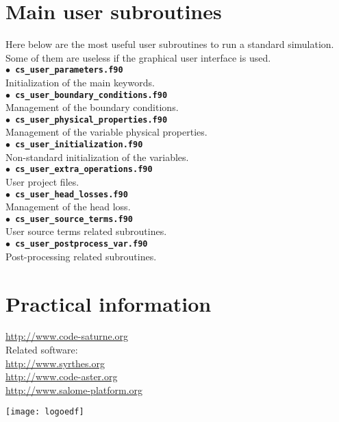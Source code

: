 \documentclass[a4paper,11pt]{article}
\newcommand{\refword}[1]{\texttt{$\bullet$ \bf{#1}}}
\begin{document}
\begin{multicols*}{3}

\section*{Main user subroutines}

Here below are the most useful user subroutines to run a standard
simulation. Some of them are useless if the graphical user interface
is used.\\

\refword{cs\_user\_parameters.f90}\\
Initialization of the main keywords.\\

\refword{cs\_user\_boundary\_conditions.f90}\\
Management of the boundary conditions.\\

\refword{cs\_user\_physical\_properties.f90}\\
Management of the variable physical properties.\\

\refword{cs\_user\_initialization.f90}\\
Non-standard initialization of the variables.\\

\refword{cs\_user\_extra\_operations.f90}\\
User project files.\\

\refword{cs\_user\_head\_losses.f90}\\
Management of the head loss.\\

\refword{cs\_user\_source\_terms.f90}\\
User source terms related subroutines.\\

\refword{cs\_user\_postprocess\_var.f90}\\
Post-processing related subroutines.\\




\section*{Practical information}

\url{http://www.code-saturne.org}\\

Related software:\\
\url{http://www.syrthes.org}\\
\url{http://www.code-aster.org}\\
\url{http://www.salome-platform.org}

\begin{center}
  \texttt{[image: logoedf]}
\end{center}

\end{multicols*}
\end{document}
